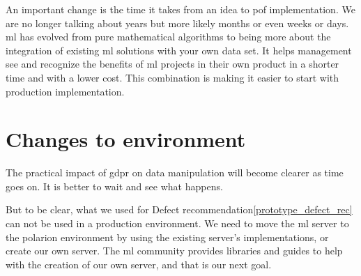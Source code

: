 \documentclass[thesis=M,english]{FITthesis}[2012/06/26]
\begin{document}
An important change is the time it takes from an idea to \acrshort{pof} implementation. We are no longer talking about years but more likely months or even weeks or days. \acrshort{ml} has evolved from pure mathematical algorithms to being more about the integration of existing \acrshort{ml} solutions with your own data set. It helps management see and recognize the benefits of \acrshort{ml} projects in their own product in a shorter time and with a lower cost. This combination is making it easier to start with production implementation.

\section{Changes to environment}

The practical impact of \acrshort{gdpr} on data manipulation will become clearer as time goes on. It is better to wait and see what happens. 

But to be clear, what we used for Defect recommendation\ref{prototype_defect_rec} can not be used in a production environment. We need to move the \acrshort{ml} server to the \acrshort{polarion} environment by using the existing server's implementations, or create our own server. The \acrshort{ml} community provides libraries and guides to help with the creation of our own server, and that is our next goal.
\end{document}
